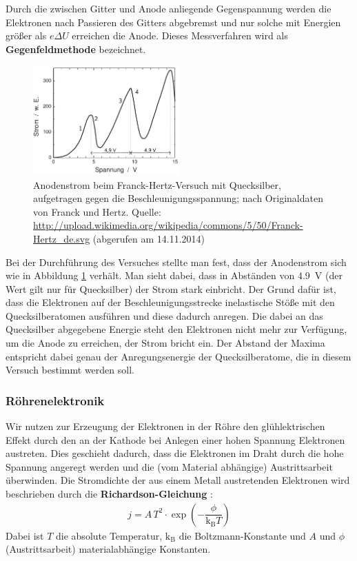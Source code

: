 \documentclass[11pt, a4paper]{article}
\begin{document}
Durch die zwischen Gitter und Anode anliegende Gegenspannung werden die Elektronen nach Passieren des Gitters abgebremst und nur solche mit Energien größer als $e\Delta U$ erreichen die Anode.
Dieses Messverfahren wird als \textbf{Gegenfeldmethode} bezeichnet.
\begin{figure}[h]
\centering
\includegraphics[width=0.5\textwidth]{./figures/franck-hertz_ergebnis.pdf}
\caption{Anodenstrom beim Franck-Hertz-Versuch mit Quecksilber, aufgetragen gegen die Beschleunigungsspannung; nach Originaldaten von Franck und Hertz. Quelle: \url{http://upload.wikimedia.org/wikipedia/commons/5/50/Franck-Hertz_de.svg} (abgerufen am 14.11.2014)}
\label{fig:franck-hertz_ergebnis}
\end{figure}
Bei der Durchführung des Versuches stellte man fest, dass der Anodenstrom sich wie in Abbildung \ref{fig:franck-hertz_ergebnis} verhält.
Man sieht dabei, dass in Abständen von \SI{4.9}{\volt} (der Wert gilt nur für Quecksilber) der Strom stark einbricht.
Der Grund dafür ist, dass die Elektronen auf der Beschleunigungsstrecke inelastische Stöße mit den Quecksilberatomen ausführen und diese dadurch anregen.
Die dabei an das Quecksilber abgegebene Energie steht den Elektronen nicht mehr zur Verfügung, um die Anode zu erreichen, der Strom bricht ein. 
Der Abstand der Maxima entspricht dabei genau der Anregungsenergie der Quecksilberatome, die in diesem Versuch bestimmt werden soll.

\subsubsection{Röhrenelektronik}
\label{sec:roehrenelektronik}
Wir nutzen zur Erzeugung der Elektronen in der Röhre den glühlektrischen Effekt durch den an der Kathode bei Anlegen einer hohen Spannung Elektronen austreten.
Dies geschieht dadurch, dass die Elektronen im Draht durch die hohe Spannung angeregt werden und die (vom Material abhängige) Austrittsarbeit überwinden.
Die Stromdichte der aus einem Metall austretenden Elektronen wird beschrieben durch die \textbf{Richardson-Gleichung} \cite{np_richardson}:
\begin{align*}
j=A\,T^2\cdot\exp\left({-\dfrac{\phi}{\mathrm{k_B}T}}\right)
\end{align*}
Dabei ist $T$ die absolute Temperatur, $\mathrm{k_B}$ die Boltzmann-Konstante und $A$ und $\phi$ (Austrittsarbeit) materialabhängige Konstanten.
\end{document}
